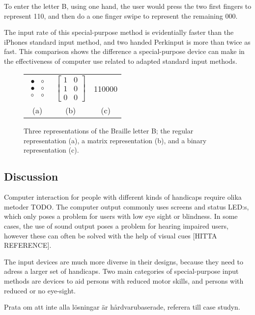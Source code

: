 To enter the letter B, using one hand, the user would press the two first fingers to represent 110, and then do a one finger swipe to represent the remaining 000.

The input rate of this special-purpose method is evidentially faster than the iPhones standard input method\cite{azenkot}, and two handed Perkinput is more than twice as fast. This comparison shows the difference a special-purpose device can make in the effectiveness of computer use related to adapted standard input methods. 

\begin{figure}[h!]
\centering

\begin{tabular}{c c c}

$
\begin{array}{cc}
\bullet & \circ \\
\bullet & \circ \\
\circ & \circ \end{array}
$

&

$
\left[ \begin{array}{cc}
1 & 0 \\
1 & 0 \\
0 & 0 \end{array} \right]
$ 

&

110000 \\

(a) & (b) & (c)

\end{tabular}


\caption{Three representations of the Braille letter B; the regular representation (a), a matrix representation (b), and a binary representation (c).}
\label{fig:brailleexample}


\end{figure}

\subsection{Discussion}
Computer interaction for people with different kinds of handicaps require olika metoder TODO. The computer output commonly uses screens and status LED:s, which only poses a problem for users with low eye sight or blindness. In some cases, the use of sound output poses a problem for hearing impaired users, however these can often be solved with the help of visual cues [HITTA REFERENCE]. 

The input devices are much more diverse in their designs, because they need to adress a larger set of handicaps. Two main categories of special-purpose input methods are devices to aid persons with reduced motor skills, and persons with reduced or no eye-sight.



Prata om att inte alla lösningar är hårdvarubaserade, referera till case studyn.

